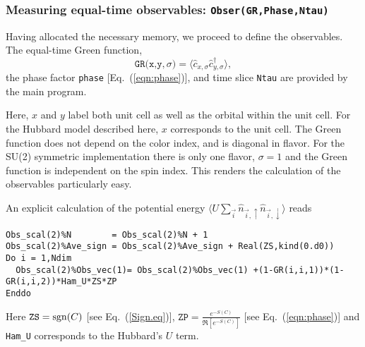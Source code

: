\subsubsection[Measuring equal-time observables: \texttt{Obser}]{Measuring equal-time observables: \texttt{Obser(GR,Phase,Ntau)}} \label{sec:EqualTimeobs}

Having allocated the necessary memory, we proceed to define the observables. The equal-time  Green function,
\begin{equation}
	 \texttt{GR(x,y},\sigma{\texttt)}  = \langle \hat{c}^{\phantom{\dagger}}_{x,\sigma} \hat{c}^{\dagger}_{y,\sigma}  \rangle,
\end{equation}
the  phase factor \texttt{phase} [Eq.~(\ref{eqn:phase})], and time slice \texttt{Ntau}   are provided by the main program.  

Here,   $x$ and $y$ label  both unit cell as well as the orbital within the unit cell. For the Hubbard model described here, $x$ corresponds to the unit cell.  The Green function  does not depend on the color index, and is diagonal in flavor.  For the SU(2) symmetric implementation  there is only one flavor, $\sigma = 1$ and the Green function is  independent on the spin index.  This renders the calculation of the observables particularly easy.   

An explicit calculation of the   potential energy  $ \langle U \sum_{\vec{i}}  \hat{n}_{\vec{i},\uparrow}   \hat{n}_{\vec{i},\downarrow}  \rangle $ reads 
\begin{lstlisting}[style=fortran]
Obs_scal(2)%N        = Obs_scal(2)%N + 1
Obs_scal(2)%Ave_sign = Obs_scal(2)%Ave_sign + Real(ZS,kind(0.d0))
Do i = 1,Ndim
  Obs_scal(2)%Obs_vec(1)= Obs_scal(2)%Obs_vec(1) +(1-GR(i,i,1))*(1-GR(i,i,2))*Ham_U*ZS*ZP
Enddo
\end{lstlisting} 
Here  $ \texttt{ZS} = \operatorname{sgn}(C) $  [see Eq.~(\ref{Sign.eq})],  $ \texttt{ZP} =   \frac{e^{-S(C)}} {\Re \left[e^{-S(C)} \right]}   $ [see Eq.~(\ref{eqn:phase})] and  \texttt{Ham\_U}  corresponds to the Hubbard's $U$ term.

